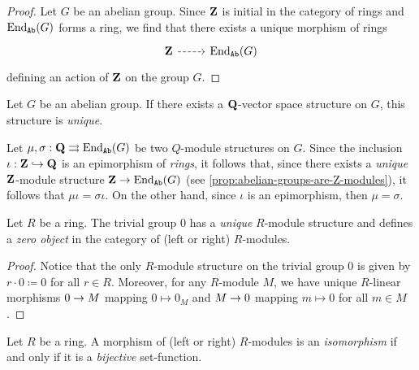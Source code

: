 \begin{proof}
    Let \(G\) be an abelian group. Since \(\mathbf{Z}\) is initial in the category of rings
    and \(\operatorname{End}_{{\texttt{Ab}}}(G)\) forms a ring, we find that there exists a unique morphism
    of rings
    \[
        \begin{tikzcd}
            \Z \ar[r, dashed] &\End_{\Ab}(G)
        \end{tikzcd}
    \]
    defining an action of \(\mathbf{Z}\) on the group \(G\).
\end{proof}

\begin{example}
    \label{exp:Q-vector-space}
    Let \(G\) be an abelian group. If there exists a \(\mathbf{Q}\)-vector
    space structure on \(G\), this structure is \emph{unique}.

    Let \(\mu, \sigma: \mathbf{Q} \rightrightarrows \operatorname{End}_{{\texttt{Ab}}}(G)\) be two \(Q\)-module structures on
    \(G\). Since the inclusion \(\iota: \mathbf{Z} \hookrightarrow \mathbf{Q}\) is an epimorphism of
    \emph{rings}, it follows that, since there exists a \emph{unique} \(\mathbf{Z}\)-module
    structure \(\mathbf{Z} \to \operatorname{End}_{{\texttt{Ab}}}(G)\) (see
    \cref{prop:abelian-groups-are-Z-modules}), it follows that
    \(\mu \iota = \sigma \iota\). On the other hand, since \(\iota\) is an
    epimorphism, then \(\mu = \sigma\).
\end{example}

\begin{proposition}
    \label{prop:zero-object-in-R-Mod}
    Let \(R\) be a ring. The trivial group \(0\) has a \emph{unique} \(R\)-module
    structure and defines a \emph{zero object} in the category of (left or right)
    \(R\)-modules.
\end{proposition}

\begin{proof}
    Notice that the only \(R\)-module structure on the trivial group \(0\) is given
    by \(r \cdot 0 \coloneq 0\) for all \(r \in R\). Moreover, for any \(R\)-module
    \(M\), we have unique \(R\)-linear morphisms \(0 \to M\) mapping
    \(0 \mapsto 0_M\) and \(M \to 0\) mapping \(m \mapsto 0\) for all
    \(m \in M\).
\end{proof}

\begin{proposition}[Isomorphisms]
    \label{prop:R-mod-iso-iff-bij}
    Let \(R\) be a ring. A morphism of (left or right) \(R\)-modules is an
    \emph{isomorphism} if and only if it is a \emph{bijective} set-function.
\end{proposition}

